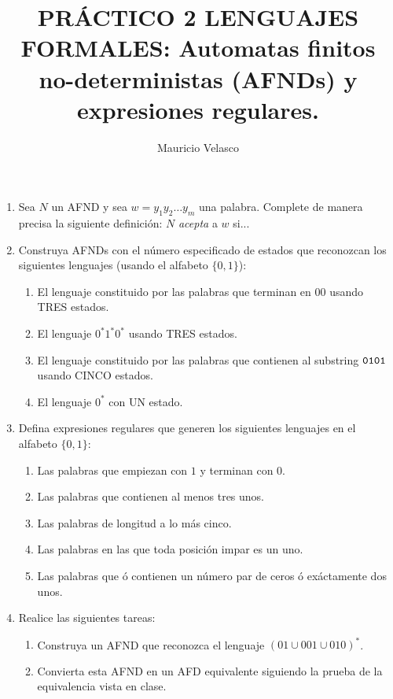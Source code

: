 \documentclass[12pt, a4paper]{article}
\date{}
\begin{document}
\title{PRÁCTICO 2 LENGUAJES FORMALES: Automatas finitos no-deterministas (AFNDs) y expresiones regulares.}
\author{Mauricio Velasco}
\maketitle{}

\begin{enumerate}
\item Sea $N$ un AFND y sea $w=y_1y_2\dots y_m$ una palabra. Complete de manera precisa la siguiente definición: $N$ \emph{acepta} a $w$ si... 

\item Construya AFNDs con el número especificado de estados que reconozcan los siguientes lenguajes (usando el alfabeto $\{0,1\}$):
\begin{enumerate}
\item El lenguaje constituido por las palabras que terminan en $00$ usando TRES estados.
\item El lenguaje $0^*1^*0^*$ usando TRES estados.
\item El lenguaje constituido por las palabras que contienen al substring $\verb!0101!$ usando  CINCO estados.
\item El lenguaje $0^*$ con UN estado.
\end{enumerate}

\item Defina expresiones regulares que generen los siguientes lenguajes en el alfabeto $\{0,1\}$:

\begin{enumerate}
\item Las palabras que empiezan con $1$ y terminan con $0$.
\item Las palabras que contienen al menos tres unos.
\item Las palabras de longitud a lo más cinco.
\item Las palabras en las que toda posición impar es un uno.
\item Las palabras que ó contienen un número par de ceros ó exáctamente dos unos.
\end{enumerate}

\item Realice las siguientes tareas:
\begin{enumerate}
\item Construya un AFND que reconozca el lenguaje $\left(01\cup 001\cup 010\right)^*$.
\item Convierta esta AFND en un AFD equivalente siguiendo la prueba de la equivalencia vista en clase.
\end{enumerate}


\end{enumerate}
\end{document}

